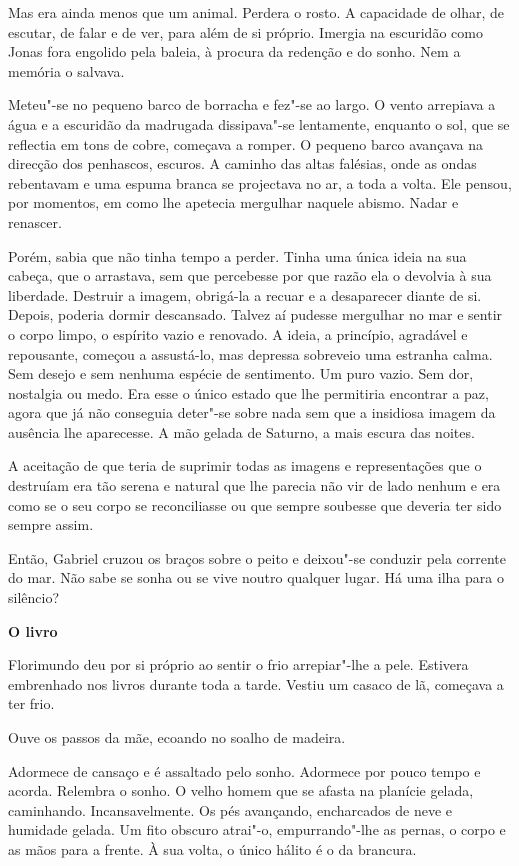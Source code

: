 Mas era ainda menos que um animal. Perdera o rosto. A capacidade de
olhar, de escutar, de falar e de ver, para além de si próprio. Imergia
na escuridão como Jonas fora engolido pela baleia, à procura da redenção
e do sonho. Nem a memória o salvava.

Meteu"-se no pequeno barco de borracha e fez"-se ao largo. O vento
arrepiava a água e a escuridão da madrugada dissipava"-se lentamente,
enquanto o sol, que se reflectia em tons de cobre, começava a romper. O
pequeno barco avançava na direcção dos penhascos, escuros. A caminho das
altas falésias, onde as ondas rebentavam e uma espuma branca se
projectava no ar, a toda a volta. Ele pensou, por momentos, em como lhe
apetecia mergulhar naquele abismo. Nadar e renascer.

Porém, sabia que não tinha tempo a perder. Tinha uma única ideia na sua
cabeça, que o arrastava, sem que percebesse por que razão ela o devolvia
à sua liberdade. Destruir a imagem, obrigá-la a recuar e a desaparecer
diante de si. Depois, poderia dormir descansado. Talvez aí pudesse
mergulhar no mar e sentir o corpo limpo, o espírito vazio e renovado. A
ideia, a princípio, agradável e repousante, começou a assustá-lo, mas
depressa sobreveio uma estranha calma. Sem desejo e sem nenhuma espécie
de sentimento. Um puro vazio. Sem dor, nostalgia ou medo. Era esse o
único estado que lhe permitiria encontrar a paz, agora que já não
conseguia deter"-se sobre nada sem que a insidiosa imagem da ausência lhe
aparecesse. A mão gelada de Saturno, a mais escura das noites.

A aceitação de que teria de suprimir todas as imagens e representações
que o destruíam era tão serena e natural que lhe parecia não vir de lado
nenhum e era como se o seu corpo se reconciliasse ou que sempre soubesse
que deveria ter sido sempre assim.

Então, Gabriel cruzou os braços sobre o peito e deixou"-se conduzir pela
corrente do mar. Não sabe se sonha ou se vive noutro qualquer lugar. Há
uma ilha para o silêncio?

\vspace*{1.8cm}
\noindent{}\textbf{O livro}

Florimundo deu por si próprio ao sentir o frio arrepiar"-lhe a pele.
Estivera embrenhado nos livros durante toda a tarde. Vestiu um casaco de
lã, começava a ter frio.

Ouve os passos da mãe, ecoando no soalho de madeira.

Adormece de cansaço e é assaltado pelo sonho. Adormece por pouco tempo e
acorda. Relembra o sonho. O velho homem que se afasta na planície
gelada, caminhando. Incansavelmente. Os pés avançando, encharcados de
neve e humidade gelada. Um fito obscuro atrai"-o, empurrando"-lhe as
pernas, o corpo e as mãos para a frente. À sua volta, o único hálito é o
da brancura.


